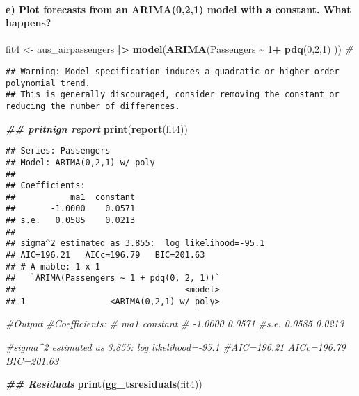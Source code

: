 \documentclass[
]{article}
\newenvironment{Shaded}{\begin{snugshade}}{\end{snugshade}}
\newcommand{\CommentTok}[1]{\textcolor[rgb]{0.56,0.35,0.01}{\textit{#1}}}
\newcommand{\DecValTok}[1]{\textcolor[rgb]{0.00,0.00,0.81}{#1}}
\newcommand{\DocumentationTok}[1]{\textcolor[rgb]{0.56,0.35,0.01}{\textbf{\textit{#1}}}}
\newcommand{\FunctionTok}[1]{\textcolor[rgb]{0.13,0.29,0.53}{\textbf{#1}}}
\newcommand{\NormalTok}[1]{#1}
\newcommand{\OtherTok}[1]{\textcolor[rgb]{0.56,0.35,0.01}{#1}}
\newcommand{\SpecialCharTok}[1]{\textcolor[rgb]{0.81,0.36,0.00}{\textbf{#1}}}
\begin{document}
\paragraph{e) Plot forecasts from an ARIMA(0,2,1) model with a constant.
What
happens?}\label{e-plot-forecasts-from-an-arima021-model-with-a-constant.-what-happens}

\begin{Shaded}
\begin{Highlighting}[]
\NormalTok{fit4 }\OtherTok{\textless{}{-}}\NormalTok{ aus\_airpassengers }\SpecialCharTok{|\textgreater{}}  \FunctionTok{model}\NormalTok{(}\FunctionTok{ARIMA}\NormalTok{(Passengers }\SpecialCharTok{\textasciitilde{}} \DecValTok{1}\SpecialCharTok{+} \FunctionTok{pdq}\NormalTok{(}\DecValTok{0}\NormalTok{,}\DecValTok{2}\NormalTok{,}\DecValTok{1}\NormalTok{) )) }\CommentTok{\#}
\end{Highlighting}
\end{Shaded}

\begin{verbatim}
## Warning: Model specification induces a quadratic or higher order polynomial trend. 
## This is generally discouraged, consider removing the constant or reducing the number of differences.
\end{verbatim}

\begin{Shaded}
\begin{Highlighting}[]
\DocumentationTok{\#\# pritnign report }
\FunctionTok{print}\NormalTok{(}\FunctionTok{report}\NormalTok{(fit4))}
\end{Highlighting}
\end{Shaded}

\begin{verbatim}
## Series: Passengers 
## Model: ARIMA(0,2,1) w/ poly 
## 
## Coefficients:
##           ma1  constant
##       -1.0000    0.0571
## s.e.   0.0585    0.0213
## 
## sigma^2 estimated as 3.855:  log likelihood=-95.1
## AIC=196.21   AICc=196.79   BIC=201.63
## # A mable: 1 x 1
##   `ARIMA(Passengers ~ 1 + pdq(0, 2, 1))`
##                                  <model>
## 1                 <ARIMA(0,2,1) w/ poly>
\end{verbatim}

\begin{Shaded}
\begin{Highlighting}[]
\CommentTok{\#Output}
\CommentTok{\#Coefficients:}
\CommentTok{\#          ma1  constant}
\CommentTok{\#      {-}1.0000    0.0571}
\CommentTok{\#s.e.   0.0585    0.0213}

\CommentTok{\#sigma\^{}2 estimated as 3.855:  log likelihood={-}95.1}
\CommentTok{\#AIC=196.21   AICc=196.79   BIC=201.63}


\DocumentationTok{\#\# Residuals}
\FunctionTok{print}\NormalTok{(}\FunctionTok{gg\_tsresiduals}\NormalTok{(fit4))}
\end{Highlighting}
\end{Shaded}
\end{document}
